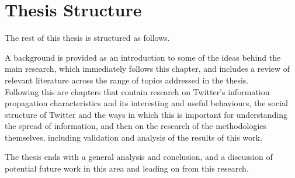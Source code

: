 \section{Thesis Structure}
The rest of this thesis is structured as follows.

A background is provided as an introduction to some of the ideas behind the main research, which immediately follows this chapter, and includes a review of relevant literature across the range of topics addressed in the thesis.\\
Following this are chapters that contain research on Twitter's information propagation characteristics and its interesting and useful behaviours, the social structure of Twitter and the ways in which this is important for understanding the spread of information, and then on the research of the methodologies themselves, including validation and analysis of the results of this work.

The thesis ends with a general analysis and conclusion, and a discussion of potential future work in this area and leading on from this research.
